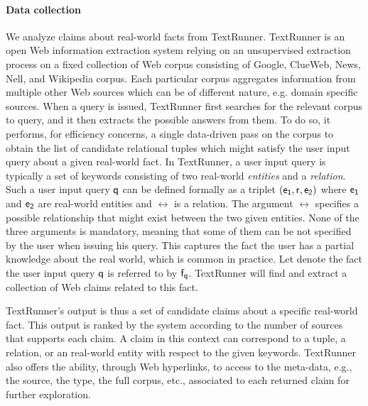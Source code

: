 \paragraph*{Data collection} We analyze claims about real-world facts
from TextRunner.
TextRunner is an open Web information extraction system relying
on an unsupervised extraction process on a fixed collection of 
Web corpus consisting of Google, ClueWeb, News, Nell, and Wikipedia 
corpus. Each particular corpus aggregates information from multiple 
other Web sources which can be of different nature, e.g. domain specific
sources. When a query is issued, TextRunner first searches for the relevant
corpus to query, and it then extracts the possible answers from them. 
To do so, it performs, for efficiency concerns, a single data-driven
pass on the corpus to obtain the list of candidate relational tuples 
which might satisfy the user input query about a given real-world fact. 
In TextRunner, a user input query is typically a set of keywords
consisting  of two real-world \emph{entities} and a \emph{relation}. Such
a user input query $\mathsf{q}$ can be defined formally as a triplet $(\mathsf{e_{1}}, \mathsf{r}_{}, \mathsf{e_{2}})$
where $\mathsf{e_{1}}$ and $\mathsf{e_{2}}$ are real-world entities and $\rel{}$ is a relation. The argument $\rel{}$ 
specifies a possible relationship that might exist between the two given entities. None of the three 
arguments is mandatory, meaning that some of them can be not specified by the user when issuing 
his query. This captures the fact the user has a partial knowledge about the real world, which is 
common in practice. Let denote the fact the user input query $\mathsf{q}$ is referred to by $\mathsf{f}_{\mathsf{q}}$. 
TextRunner will find and extract a collection of Web claims related to this fact.

TextRunner's output is thus a set of candidate claims about a specific real-world fact.
This output is ranked by the system according to the number of sources that supports each
claim. A claim in this context can correspond to a tuple, a relation, or an real-world entity 
with respect to the given keywords. TextRunner also offers the ability, through Web hyperlinks, 
to access to the meta-data, e.g., the source, the type, the full corpus, etc., associated to each 
returned claim for further exploration. 

